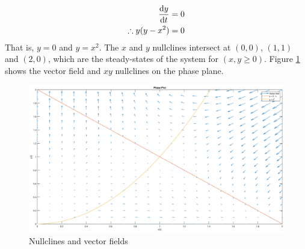 \documentclass[12pt,1in]{article}
\newenvironment{Example}[2][Example]{\begin{trivlist}
		\item[\hskip \labelsep {\bfseries #1}\hskip \labelsep {\bfseries #2.}]}{\end{trivlist}}
\begin{document}
\begin{Example}{2}
\begin{align*}
	\derivative{y}{t} &= 0\\
	\therefore y(y - x^2 ) &= 0
	\end{align*}
	That is, $y = 0$ and $y = x^2$. The $x$ and $y$ nullclines intersect at $(0,0)$, $(1,1)$ and $(2,0)$, which are the steady-states of the system for $(x,y \ge 0)$. Figure \ref{fig:example2} shows the vector field and $xy$ nullclines on the phase plane. 
\begin{figure}[H]
	\centering
	\includegraphics[trim={2in 0 2in 0},width=\linewidth]{Figures/example_2}
	\caption{Nullclines and vector fields}
	\label{fig:example2}
\end{figure}
\end{Example}
\end{document}
